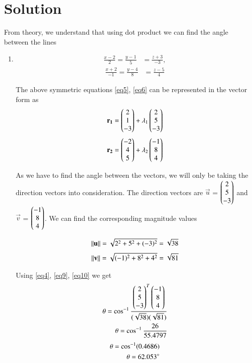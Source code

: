 \documentclass[journal,12pt,twocolumn]{IEEEtran}
\begin{document}
\section{\textbf{Solution}}
From theory, we understand that using dot product we can find the angle between the lines 
\begin{enumerate}
	\item 
	\begin{align}\label{eq5}
		\frac{x-2}{2} = \frac{y-1}{5} &= \frac{z+3}{-3}, 
	\end{align}
	\begin{align}\label{eq6}
		\frac{x+2}{-1} = \frac{y-4}{8} &= \frac{z-5}{4} 
	\end{align}


The above symmetric equations \ref{eq5}, \ref{eq6} can be represented in the vector form as 
\begin{align}\label{eq7}
	\quad \mathbf{r_1} &= \begin{pmatrix}2\\1\\-3\end{pmatrix} + \lambda_1\begin{pmatrix}2\\5\\-3\end{pmatrix}
\end{align}
\begin{align}\label{eq8}
	\quad \mathbf{r_2} &= \begin{pmatrix}-2\\4\\5\end{pmatrix} + \lambda_2\begin{pmatrix}-1\\8\\4\end{pmatrix}
\end{align}

As we have to find the angle between the vectors, we will only be taking the direction vectors into consideration. The direction vectors are $\vec{u}$ = $\begin{pmatrix}2\\5\\-3\end{pmatrix}$ and $\vec{v}$ = $\begin{pmatrix}-1\\8\\4\end{pmatrix}$. We can find the corresponding magnitude values

\begin{align}\label{eq9}
	\left\lVert\mathbf{u}\right\rVert =\sqrt{2^{2}+5^{2}+(-3)^{2}} =\sqrt{38}
\end{align}
\begin{align}\label{eq10}
	\left\lVert\mathbf{v}\right\rVert =\sqrt{(-1)^{2}+8^{2}+4^{2}} =\sqrt{81}
\end{align}

Using \ref{eq4}, \ref{eq9}, \ref{eq10} we get
\begin{align}
	\theta = \cos ^{-1}\frac{\begin{pmatrix}2\\5\\-3\end{pmatrix}^{T}\begin{pmatrix}-1\\8\\4\end{pmatrix}}{(\sqrt{38})(\sqrt{81})} 
	\\
	\theta = \cos ^{-1}\frac{26}{55.4797}
\end{align}
\begin{align}
	\theta = \cos ^{-1} (0.4686)
	\\
	\theta = 62.053\degree
\end{align}


\end{enumerate}
\end{document}
